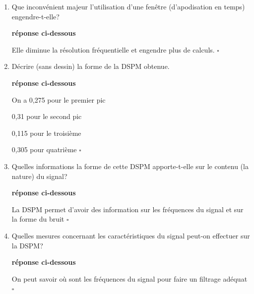 \documentclass{article}
\newcommand{\debutrep}[1]{\color{blue}\begin{center} \hrulefill \textbf{ #1 } \hrulefill \end{center} }
\newcommand{\finrep}{\vspace*{5mm}\hfill $\square$\color{black}\vspace*{5mm}}
\begin{document}
\begin{enumerate}
\renewcommand{\theenumi}{\Alph{enumi}}

\item Que inconvénient majeur l'utilisation d'une fenêtre (d'apodisation en temps) engendre-t-elle?

\debutrep{réponse ci-dessous}
Elle diminue la résolution fréquentielle et engendre plus de calculs.
\finrep

\item Décrire (sans dessin) la forme de la DSPM obtenue.

\debutrep{réponse ci-dessous}
On a 0,275 pour le premier pic

0,31  pour le second pic

0,115 pour le troisième

0,305 pour quatrième
\finrep

\item Quelles informations la forme de cette DSPM apporte-t-elle sur le contenu (la nature) du signal?
\debutrep{réponse ci-dessous}
La DSPM permet d'avoir des information sur les fréquences du signal et sur la forme du bruit
\finrep

\item Quelles mesures concernant  les caractéristiques du signal peut-on effectuer sur la DSPM?

\debutrep{réponse ci-dessous}
On peut savoir où sont les fréquences du signal pour faire un filtrage adéquat
\finrep

\end{enumerate}
\end{document}
